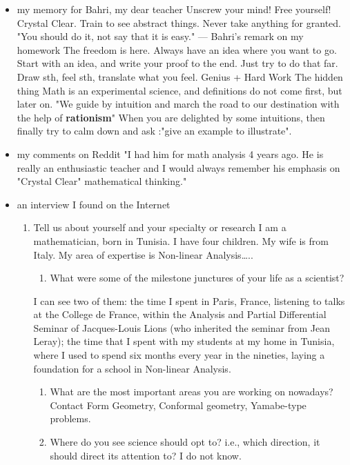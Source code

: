 \documentclass[11pt]{article}
\begin{document}
\begin{itemize}
\item my memory for Bahri, my dear teacher
\label{sec:orgheadline118}
Unscrew your mind! Free yourself!
Crystal Clear.
Train to see abstract things.
Never take anything for granted.
"You should do it, not say that it is easy." --- Bahri's remark on my homework
The freedom is here.
Always have an idea where you want to go.
Start with an idea, and write your proof to the end.
Just try to do that far.
Draw sth, feel sth, translate what you feel.
Genius + Hard Work
The hidden thing
Math is an experimental science, and definitions do not come first, but later on.
"We guide by intuition and march the road to our destination with the help of \textbf{rationism}"
When you are delighted by some intuitions, then finally try to calm down and ask :"give an example to illustrate".
\item my comments on Reddit
\label{sec:orgheadline119}
"I had him for math analysis 4 years ago. He is really an enthusiastic teacher and I would always remember his emphasis on "Crystal Clear" mathematical thinking."
\item an interview I found on the Internet
\label{sec:orgheadline120}
\begin{enumerate}
\item Tell us about yourself and your specialty or research
I am a mathematician, born in Tunisia. I have four children. My wife is from Italy. My area of expertise is Non-linear Analysis\ldots{}..

\begin{enumerate}
\item What were some of the milestone junctures of your life as a scientist?
\end{enumerate}
I can see two of them: the time I spent in Paris, France, listening to talks at the College de France, within the Analysis and Partial Differential Seminar of Jacques-Louis Lions (who inherited the seminar from Jean Leray); the time that I spent with my students at my home in Tunisia, where I used to spend six months every year in the nineties, laying a foundation for a school in Non-linear Analysis.

\begin{enumerate}
\item What are the most important areas you are working on nowadays?
Contact Form Geometry, Conformal geometry, Yamabe-type problems.

\item Where do you see science should opt to? i.e., which direction, it should direct its attention to?
I do not know.


\end{enumerate}
\end{enumerate}
\end{itemize}
\end{document}
